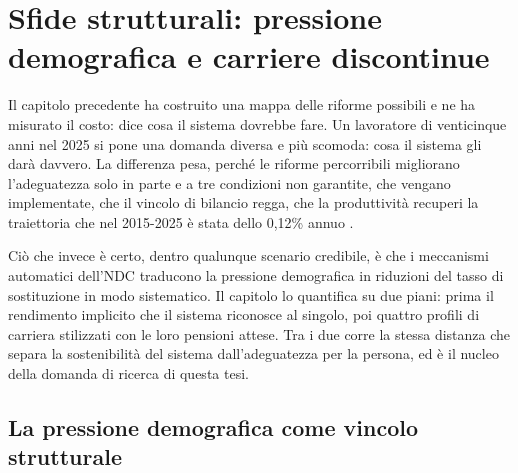 
\chapter{Sfide strutturali: pressione demografica e carriere discontinue}
\label{ch:sfide}

\noindent
Il capitolo precedente ha costruito una mappa delle riforme possibili e ne ha
misurato il costo: dice cosa il sistema dovrebbe fare. Un lavoratore di
venticinque anni nel 2025 si pone una domanda diversa e più scomoda: cosa il
sistema gli darà davvero. La differenza pesa, perché le riforme percorribili
migliorano l'adeguatezza solo in parte e a tre condizioni non garantite, che
vengano implementate, che il vincolo di bilancio regga, che la produttività
recuperi la traiettoria che nel 2015-2025 è stata dello 0,12\% annuo
\cite{OCPI2026}.

\medskip
\noindent
Ciò che invece è certo, dentro qualunque scenario credibile, è che i meccanismi
automatici dell'NDC traducono la pressione demografica in riduzioni del tasso di
sostituzione in modo sistematico. Il capitolo lo quantifica su due piani: prima il
rendimento implicito che il sistema riconosce al singolo, poi quattro profili di
carriera stilizzati con le loro pensioni attese. Tra i due corre la stessa distanza
che separa la sostenibilità del sistema dall'adeguatezza per la persona, ed è il
nucleo della domanda di ricerca di questa tesi.

\section{La pressione demografica come vincolo strutturale}
\label{sec:demografia}


